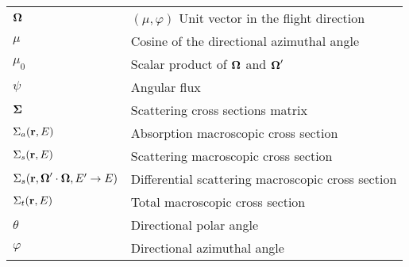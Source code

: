 \begin{xtabular}{ll}
     $\boldsymbol{\Omega}$ & $(\mu,\varphi)$ Unit vector in the flight direction \tabularnewline
     $\mu$ & Cosine of the directional azimuthal angle \tabularnewline
   $\mu_0$ & Scalar product of $\boldsymbol{\Omega}$ and $\boldsymbol{\Omega}'$ \tabularnewline
    $\psi$ & Angular flux \tabularnewline
$\boldsymbol{\Sigma}$ & Scattering cross sections matrix \tabularnewline
$\Sigma_a(\mathbf{r},E)$ & Absorption macroscopic cross section \tabularnewline
$\Sigma_s(\mathbf{r},E)$ & Scattering macroscopic cross section \tabularnewline
$\Sigma_s(\mathbf{r},\boldsymbol{\Omega}'\cdot\boldsymbol{\Omega},E'\rightarrow E)$ & Differential scattering macroscopic 
  cross section \tabularnewline
$\Sigma_t(\mathbf{r},E)$ & Total macroscopic cross section \tabularnewline
  $\theta$ & Directional polar angle \tabularnewline
 $\varphi$ & Directional azimuthal angle \tabularnewline
\end{xtabular}

\pagebreak{}
